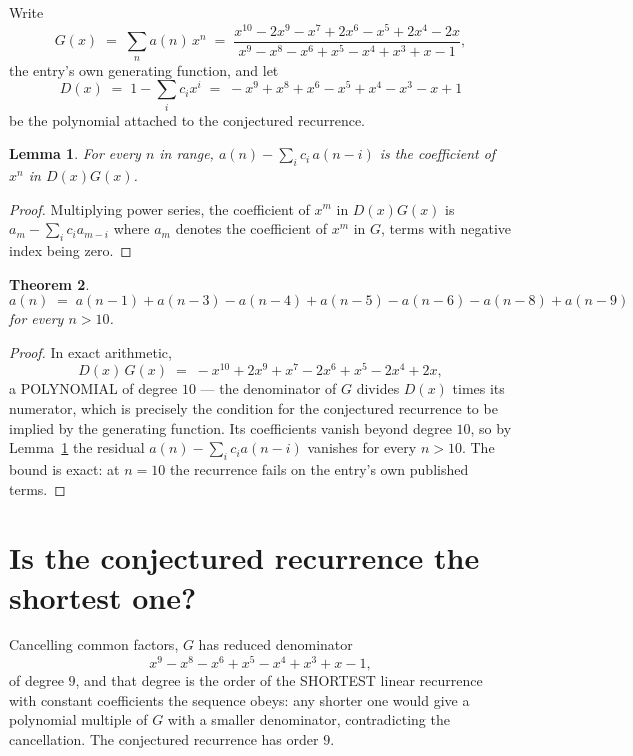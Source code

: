 \documentclass[11pt,a4paper]{article}
\theoremstyle{plain}
\newtheorem{theorem}{Theorem}
\newtheorem{lemma}[theorem]{Lemma}
\theoremstyle{definition}
\begin{document}
Write
\[
G(x)\;=\;\sum_{n}a(n)\,x^{n}\;=\;\frac{x^{10} - 2 x^{9} - x^{7} + 2 x^{6} - x^{5} + 2 x^{4} - 2 x}{x^{9} - x^{8} - x^{6} + x^{5} - x^{4} + x^{3} + x - 1},
\]
the entry's own generating function, and let
\[
D(x)\;=\;1-\sum_i c_i x^{i}\;=\;- x^{9} + x^{8} + x^{6} - x^{5} + x^{4} - x^{3} - x + 1
\]
be the polynomial attached to the conjectured recurrence.

\begin{lemma}\label{lem:key}
For every $n$ in range, $a(n)-\sum_i c_i\,a(n-i)$ is the coefficient of $x^{n}$ in
$D(x)G(x)$.
\end{lemma}

\begin{proof}
Multiplying power series, the coefficient of $x^{m}$ in $D(x)G(x)$ is
$a_m-\sum_i c_i a_{m-i}$ where $a_m$ denotes the coefficient of $x^{m}$ in $G$, terms with
negative index being zero.
\end{proof}

\begin{theorem}
\[
a(n)\;=\;a(n-1) + a(n-3) - a(n-4) + a(n-5) - a(n-6) - a(n-8) + a(n-9)
\]
for every $n>10$.
\end{theorem}

\begin{proof}
In exact arithmetic,
\[
D(x)\,G(x)\;=\;- x^{10} + 2 x^{9} + x^{7} - 2 x^{6} + x^{5} - 2 x^{4} + 2 x,
\]
a POLYNOMIAL of degree $10$ --- the denominator of $G$ divides $D(x)$ times its numerator,
which is precisely the condition for the conjectured recurrence to be implied by the
generating function. Its coefficients vanish beyond degree $10$, so by
Lemma~\ref{lem:key} the residual $a(n)-\sum_ic_ia(n-i)$ vanishes for every
$n>10$. The bound is exact: at $n=10$ the recurrence fails on the entry's own published terms.
\end{proof}

\section{Is the conjectured recurrence the shortest one?}

Cancelling common factors, $G$ has reduced denominator
\[
x^{9} - x^{8} - x^{6} + x^{5} - x^{4} + x^{3} + x - 1,
\]
of degree $9$, and that degree is the order of the SHORTEST linear recurrence with
constant coefficients the sequence obeys: any shorter one would give a polynomial multiple of
$G$ with a smaller denominator, contradicting the cancellation. The conjectured recurrence has
order $9$.
\end{document}
